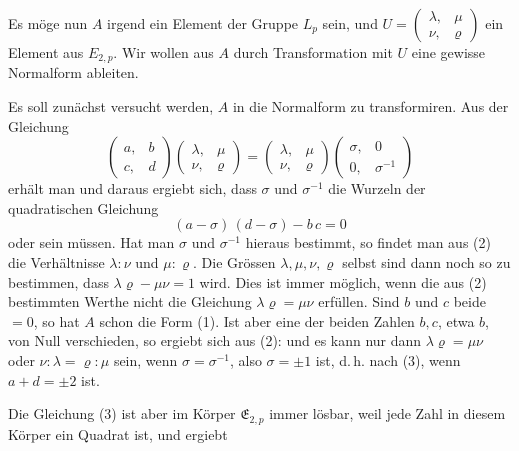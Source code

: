 Es möge nun $A$ irgend ein Element der Gruppe $L_p$ sein,
und $U = \begin{pmatrix} \lambda, & \mu \\ \nu, & \varrho \end{pmatrix}$ ein Element aus $E_{2,p}$. Wir wollen aus $A$ durch
Transformation mit $U$ eine gewisse Normalform ableiten.

Es soll zunächst versucht werden, $A$ in die Normalform
zu transformiren. Aus der Gleichung
\[
\begin{pmatrix} a, & b \\ c, & d \end{pmatrix} \begin{pmatrix} \lambda, & \mu \\ \nu, & \varrho \end{pmatrix} = \begin{pmatrix} \lambda, & \mu \\ \nu, & \varrho \end{pmatrix} \begin{pmatrix} \sigma, & 0 \\ 0, & \sigma^{-1} \end{pmatrix}
\]
erhält man
und daraus ergiebt sich, dass $\sigma$ und $\sigma^{-1}$ die Wurzeln der quadratischen
Gleichung
\[
(a-\sigma)\,(d-\sigma) - b\,c = 0
\]
oder
sein müssen. Hat man $\sigma$ und $\sigma^{-1}$ hieraus bestimmt, so findet
man aus (2) die Verhältnisse $\lambda : \nu$ und $\mu : \varrho$. Die Grössen $\lambda, \mu, \nu, \varrho$
selbst sind dann noch so zu bestimmen, dass $\lambda\varrho - \mu\nu = 1$ wird.
Dies ist immer möglich, wenn die aus (2) bestimmten Werthe
nicht die Gleichung $\lambda\varrho = \mu\nu$ erfüllen. Sind $b$ und $c$ beide $= 0$,
so hat $A$ schon die Form (1). Ist aber eine der beiden Zahlen
$b, c$, etwa $b$, von Null verschieden, so ergiebt sich aus (2):
und es kann nur dann $\lambda\varrho = \mu\nu$ oder $\nu : \lambda = \varrho : \mu$ sein, wenn
$\sigma = \sigma^{-1}$, also $\sigma = \pm 1$ ist, d.\,h. nach (3), wenn $a + d = \pm 2$ ist.

Die Gleichung (3) ist aber im Körper $\mathfrak{E}_{2,p}$ immer lösbar, weil
jede  Zahl in diesem Körper ein Quadrat ist, und ergiebt
